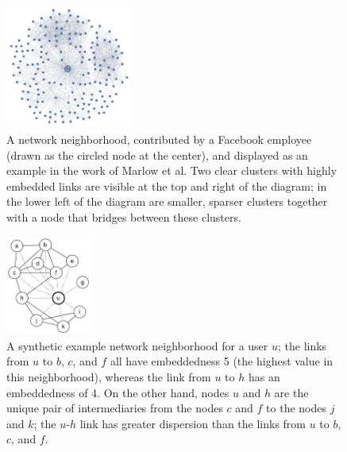 \documentclass{sigchi}
\def\rs{\vspace*{-0.10in}}
\begin{document}
\begin{figure}[t]
 \begin{center}
 \includegraphics[width=0.37\textwidth]{fb-nbrhd-all}
 \end{center}
\caption{
 \label{fig:nb-real}
A network neighborhood, contributed by 
a Facebook employee (drawn as the circled node at the center),
and displayed as an example in the work of 
Marlow et al\protect\cite{marlow-facebook-tie-strength-ext}.
Two clear clusters with highly embedded links are visible at the top
and right of the diagram; in the lower left of the diagram are
smaller, sparser clusters together with a node
that bridges between these clusters.
\rs 
  }
\end{figure}

\begin{figure}[t]
\begin{center}
 \includegraphics[width=0.25\textwidth]{nb-example5fn}
 \end{center}
\caption{
 \label{fig:nb-synth}
A synthetic example
network neighborhood for a user $u$; the links from $u$ to $b$, $c$, and $f$
all have embeddedness 5 (the highest value in this neighborhood),
whereas the link from $u$ to $h$ has an embeddedness of 4.
On the other hand, 
nodes $u$ and $h$ are the unique pair of intermediaries
from the nodes $c$ and $f$ to the nodes $j$ and $k$;
the $u$-$h$ link has greater dispersion
than the links from $u$ to $b$, $c$, and $f$.
\rs 
  }
\end{figure}
\end{document}
